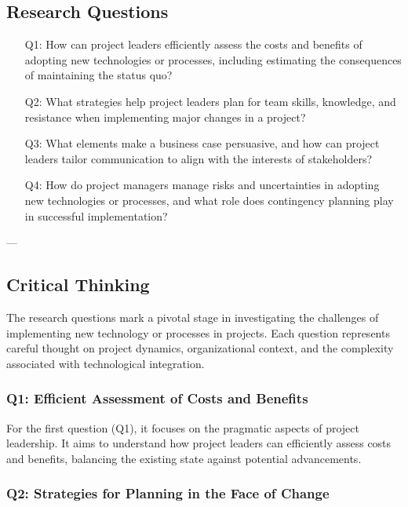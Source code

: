 \documentclass{article}
\begin{document}
\subsection{Research Questions}
\begin{enumerate}
    \item[Q1:] How can project leaders efficiently assess the costs and benefits of adopting new technologies or processes, including estimating the consequences of maintaining the status quo?
    
    \item[Q2:] What strategies help project leaders plan for team skills, knowledge, and resistance when implementing major changes in a project?
    
    \item[Q3:] What elements make a business case persuasive, and how can project leaders tailor communication to align with the interests of stakeholders?
    
    \item[Q4:] How do project managers manage risks and uncertainties in adopting new technologies or processes, and what role does contingency planning play in successful implementation?
\end{enumerate}


---
\subsection{Critical Thinking}

The research questions mark a pivotal stage in investigating the challenges of implementing new technology or processes in projects. Each question represents careful thought on project dynamics, organizational context, and the complexity associated with technological integration.

\subsubsection*{Q1: Efficient Assessment of Costs and Benefits}

For the first question (Q1), it focuses on the pragmatic aspects of project leadership. It aims to understand how project leaders can efficiently assess costs and benefits, balancing the existing state against potential advancements.

\subsubsection*{Q2: Strategies for Planning in the Face of Change}
\end{document}
